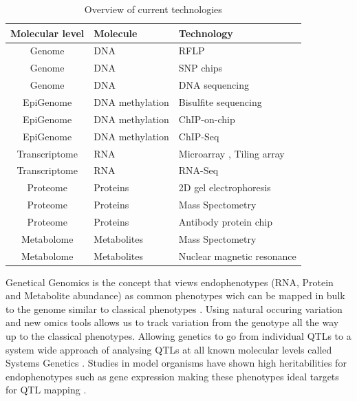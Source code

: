 \begin{table}[h]
  \centering
  {\footnotesize
  \begin{tabular}{ | c | l | l | }
    \hline
    {\bf Molecular level} & {\bf Molecule} & {\bf Technology}\\
    \hline
    \hline
\rowcolor{gray!35}    Genome          & DNA                & RFLP \cite{Lander:1986} \\
\rowcolor{gray!35}    Genome          & DNA                & SNP chips \cite{Hacia:1999} \\
\rowcolor{gray!35}    Genome          & DNA                & DNA sequencing \cite{Mardis:2008} \\
    \hline
    EpiGenome       & DNA methylation    & Bisulfite sequencing \cite{Hayatsu:2007} \\
    EpiGenome       & DNA methylation    & ChIP-on-chip \cite{Collas:2010} \\
    EpiGenome       & DNA methylation    & ChIP-Seq \cite{Park:2009} \\
    \hline
    \hline
\rowcolor{gray!35}    Transcriptome   & RNA          & Microarray \cite{Lashkari:1997}, Tiling array \cite{Lee:2013} \\
\rowcolor{gray!35}    Transcriptome   & RNA          & RNA-Seq \cite{Wang:2009}\\
    \hline
    Proteome        & Proteins     & 2D gel electrophoresis \cite{O'Farrell:1975}\\
    Proteome        & Proteins     & Mass Spectometry \cite{Deshaies:2001}\\
    Proteome        & Proteins     & Antibody protein chip \cite{Fasolo:2009} \\
    \hline
\rowcolor{gray!35}    Metabolome      & Metabolites  & Mass Spectometry \cite{Aebersold:2003} \\
\rowcolor{gray!35}    Metabolome      & Metabolites  & Nuclear magnetic resonance \cite{Espina:2009} \\
    \hline
  \end{tabular}
  }
  \caption[Overview]{Overview of current technologies}
\end{table}

Genetical Genomics is the concept that views endophenotypes (RNA, Protein and Metabolite abundance) 
as common phenotypes wich can be mapped in bulk to the genome similar to classical 
phenotypes \cite{Jansen:2001a}. Using natural occuring variation and new omics tools allows us 
to track variation from the genotype all the way up to the classical phenotypes. Allowing 
genetics to go from individual QTLs to a system wide approach of analysing QTLs at all known 
molecular levels called Systems Genetics \cite{Threadgill:2006}. Studies in model organisms 
have shown high heritabilities for endophenotypes such as gene expression making these phenotypes 
ideal targets for QTL mapping \cite{Brem:2002}. 

